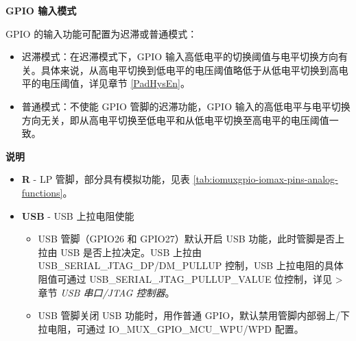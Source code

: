 \textbf{GPIO 输入模式}

GPIO 的输入功能可配置为迟滞或普通模式：
\begin{itemize}
    \item 迟滞模式：在迟滞模式下，GPIO 输入高低电平的切换阈值与电平切换方向有关。具体来说，从高电平切换到低电平的电压阈值略低于从低电平切换到高电平的电压阈值，详见章节 \ref{PadHysEn}。 
    \item 普通模式：不使能 GPIO 管脚的迟滞功能，GPIO 输入的高低电平与电平切换方向无关，即从高电平切换至低电平和从低电平切换至高电平的电压阈值一致。
\end{itemize}

\textbf{说明}

\begin{itemize}
\item \textbf{R} - LP 管脚，部分具有模拟功能，见表 \ref{tab:iomuxgpio-iomax-pins-analog-functions}。
\item \textbf{USB} - USB 上拉电阻使能            
\begin{itemize}
    \item USB 管脚（GPIO26 和 GPIO27）默认开启 USB 功能，此时管脚是否上拉由 USB 是否上拉决定。USB 上拉由 USB\_SERIAL\_JTAG\_DP/DM\_PULLUP 控制，USB 上拉电阻的具体阻值可通过 USB\_SERIAL\_JTAG\_PULLUP\_VALUE 位控制，详见  > 章节 \textit{USB 串口/JTAG 控制器}。
    \item USB 管脚关闭 USB 功能时，用作普通 GPIO，默认禁用管脚内部弱上/下拉电阻，可通过 IO\_MUX\_GPIO\_MCU\_WPU/WPD 配置。
\end{itemize}
\end{itemize}
